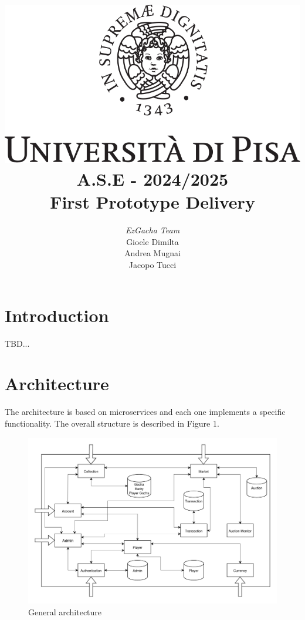 \documentclass{article}
\begin{document}
\title{\includegraphics[scale=.2]{logo.png} \\[3ex] A.S.E - 2024/2025 \\ First Prototype Delivery}
\author{{\large \emph{EzGacha Team}} \\[1ex] Gioele Dimilta \\ Andrea Mugnai \\ Jacopo Tucci}
\date{}

\maketitle

\newpage
{}
\tableofcontents

\newpage
\section{Introduction}
TBD...

\section{Architecture}
The architecture is based on microservices and each one implements a specific functionality. The overall structure is described in Figure 1.
\begin{figure}[ht]
    \centering
    \includegraphics[width=12cm]{architecture-v2.drawio.png}
    \caption{General architecture}
\end{figure}
\end{document}

